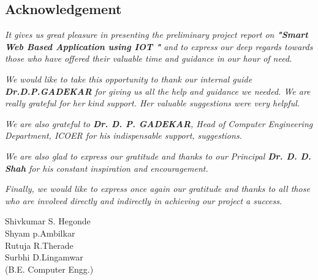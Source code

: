 \documentclass[10pt,a4paper]
{article}
\numberwithin{table}{section}
\begin{document}
\newpage
		\begin{center}				%
			
				\section*{Acknowledgement}
				\vspace{.15 in}       %
			
		\end{center}

		\begin{normalsize}
		
		
{

				{\setlength{\baselineskip}{1.5\baselineskip}
				\textit{It gives us great pleasure in presenting the preliminary project report on  \textbf{"Smart Web Based Application using IOT  "} and to express our deep regards towards those who have offered their valuable time and guidance in our hour of need.}
				
	\vspace*{.15in}	
	
\textit{We would like to take this opportunity to thank our internal guide \textbf{Dr.D.P.GADEKAR}  for giving us all the help and guidance we needed. We are really grateful for her kind support. Her valuable suggestions were very helpful.}

\vspace*{.15in}	

\textit{We are also grateful to \textbf{Dr. D. P. GADEKAR}, Head of Computer Engineering Department, ICOER for his indispensable support, suggestions.}

\vspace*{.15in}	

\textit{We are also glad to express our gratitude and thanks to our Principal \textbf{Dr. D. D. Shah} for his constant inspiration and encouragement.}

\vspace*{.15in}	

\textit{Finally, we would like to express once again our gratitude and thanks to all those who are involved directly and indirectly in achieving our project a success.}



	
}
				\vspace{2.2 in}
			\flushright
				\hspace*{1.9 in}Shivkumar S. Hegonde \\
				\hspace*{1.9 in}Shyam p.Ambilkar \\
				\hspace*{1.9 in}Rutuja R.Therade \\
				\hspace*{1.9 in}Surbhi D.Lingamwar \\
				\hspace*{1.9 in}(B.E. Computer Engg.)
					
}
\end{normalsize}
\end{document}
